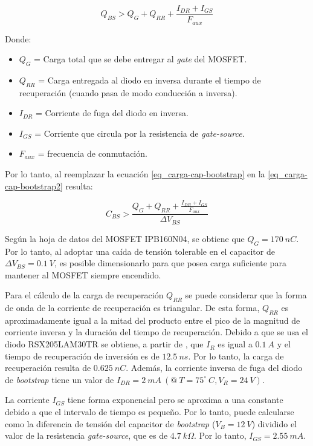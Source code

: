 \begin{equation} \label{eq_carga-cap-bootstrap2}
	Q_{BS} > Q_G + Q_{RR} + \frac{I_{DR}+I_{GS}}{F_{aux}}
\end{equation}

\noindent Donde:
\begin{itemize}
	\item $Q_G$ = Carga total que se debe entregar al \textsl{gate} del MOSFET.
	\item $Q_{RR}$ = Carga entregada al diodo en inversa durante el tiempo de recuperación (cuando pasa de modo conducción a inversa).
	\item $I_{DR}$ = Corriente de fuga del diodo en inversa.
	\item $I_{GS}$ = Corriente que circula por la resistencia de \textsl{gate-source}.
	\item $F_{aux}$ = frecuencia de conmutación.
\end{itemize}


\noindent Por lo tanto, al reemplazar la ecuación \ref{eq_carga-cap-bootstrap} en la \ref{eq_carga-cap-bootstrap2} resulta:


\begin{equation} \label{eq_cap-bootstrap}
	C_{BS} > \frac{Q_G+Q_{RR} + \frac{I_{DR}+I_{GS}}{F_{aux}}}{\Delta V_{BS}}
\end{equation}

\noindent Según la hoja de datos \cite{IPB160N04} del MOSFET IPB160N04, se obtiene que $Q_G= 170\:nC$. Por lo tanto, al adoptar una caída de tensión tolerable en el capacitor de $\Delta V_{BS} = 0.1\:V$, es posible dimensionarlo para que posea carga suficiente para mantener al MOSFET siempre encendido.

\noindent Para el cálculo de la carga de recuperación $Q_{RR}$ se puede considerar que la forma de onda de la corriente de recuperación es triangular. De esta forma,  $Q_{RR}$ es aproximadamente igual a la mitad del producto entre el pico de la magnitud de corriente inversa y la duración del tiempo de recuperación.  Debido a que se usa el diodo RSX205LAM30TR se obtiene, a partir de \cite{RSX205LAM30}, que  $I_R$ es igual a $0.1\:A$  y  el tiempo de recuperación de inversión es de $12.5\:ns$. Por lo tanto, la carga de recuperación resulta de $0.625\:nC$. Además, la corriente inversa de fuga del diodo de \textsl{bootstrap} tiene un valor de $I_{DR} =2 \:mA\:(@\: T=75^{\circ}\:C, V_R= 24\:V)$.

\noindent La corriente $I_{GS}$ tiene forma exponencial pero se aproxima a una constante debido a que el intervalo de tiempo es pequeño. Por lo tanto, puede calcularse como la diferencia de tensión del capacitor de \textsl{bootstrap} ($V_B=12\:V$) dividido el valor de la resistencia \textsl{gate-source}, que es de $4.7\:k\Omega$. Por lo tanto, $I_{GS}=2.55 \:mA$. 


